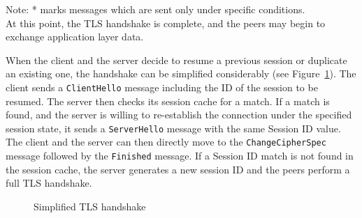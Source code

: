     Note: * marks messages which are sent only under specific conditions. \\

    At this point, the TLS handshake is complete, and the peers may begin to
    exchange application layer data.

    \label{ref:session-resumption}
    When the client and the server decide to resume a previous session or duplicate
    an existing one, the handshake can be simplified considerably
    (see Figure~\ref{fig:simplied_tls_handshake}). The client
    sends a \texttt{ClientHello} message including the ID of the session to be
    resumed. The server then checks its session cache for a match. If a match
    is found, and the server is willing to re-establish the connection under
    the specified session state, it sends a \texttt{ServerHello} message with
    the same Session ID value. The client and the server can then directly move
    to the \texttt{ChangeCipherSpec} message followed by the \texttt{Finished}
    message. If a Session ID match is not found in the session cache, the
    server generates a new session ID and the peers perform a full TLS handshake.

    \begin{figure}[H]
    \centering
    \caption{Simplified TLS handshake} \label{fig:simplied_tls_handshake}
    \end{figure}

